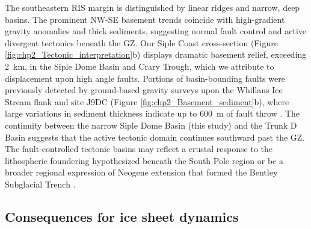 The southeastern RIS margin is distinguished by linear ridges and narrow, deep basins. The prominent NW-SE basement trends coincide with high-gradient gravity anomalies \citep[Figure \ref{fig:appA_S1}a,][]{tintoross2019} and thick sediments, suggesting normal fault control and active divergent tectonics beneath the GZ. Our Siple Coast cross-section (Figure \ref{fig:chp2_Tectonic_interpretation}b) displays dramatic basement relief, exceeding 2~km, in the Siple Dome Basin and Crary Trough, which we attribute to displacement upon high angle faults. Portions of basin-bounding faults were previously detected by ground-based gravity surveys upon the Whillans Ice Stream flank \citep[Figure \ref{fig:chp2_Tectonic_interpretation}a,][]{mutobathymetry2013} and site J9DC (Figure \ref{fig:chp2_Basement_sediment}b), where large variations in sediment thickness indicate up to 600~m of fault throw \citep{greischaranalysis1992}. The continuity between the narrow Siple Dome Basin (this study) and the Trunk D Basin \citep[Figure \ref{fig:chp2_Basement_sediment}a,][]{bellidentifying2006} suggests that the active tectonic domain continues southward past the GZ. The fault-controlled tectonic basins may reflect a crustal response to the lithospheric foundering hypothesized beneath the South Pole region \citep{shenseismic2018} or be a broader regional expression of Neogene extension that formed the Bentley Subglacial Trench \citep{lloydseismic2015}.

\subsection{Consequences for ice sheet dynamics}

